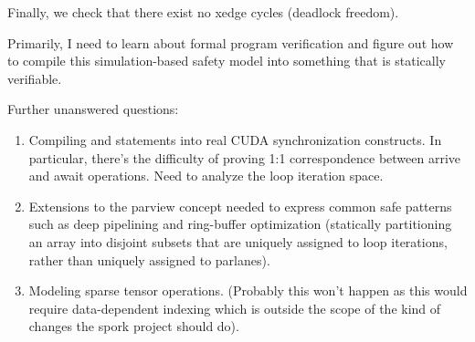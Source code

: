 Finally, we check that there exist no xedge cycles (deadlock freedom).

\filbreak
{}

Primarily, I need to learn about formal program verification and figure out how to compile this simulation-based safety model into something that is statically verifiable.

Further unanswered questions:
\begin{enumerate}
  \item Compiling  and  statements into real CUDA synchronization constructs.
    In particular, there's the difficulty of proving 1:1 correspondence between arrive and await operations.
    Need to analyze the loop iteration space.
  \item Extensions to the parview concept needed to express common safe patterns such as deep pipelining and ring-buffer optimization (statically partitioning an array into disjoint subsets that are uniquely assigned to loop iterations, rather than uniquely assigned to parlanes).
  \item Modeling sparse tensor operations. (Probably this won't happen as this would require data-dependent indexing which is outside the scope of the kind of changes the spork project should do).
\end{enumerate}


